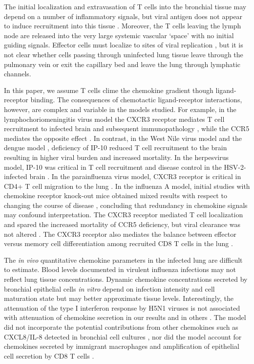 \documentclass[10pt]{article}
\begin{document}
The initial localization and extravasation of T cells into the bronchial tissue may depend on a number of inflammatory signals, but viral antigen does not appear to induce recruitment into this tissue \cite{Topham2001}.   Moreover, the T cells leaving the lymph node are released into the very large systemic vascular `space' with no initial guiding signals.  Effector cells must localize to sites of viral replication \cite{Cerwenka1999}, but it is not clear whether cells passing through uninfected lung tissue leave through the pulmonary vein or exit the capillary bed and leave the lung through lymphatic channels. 

In this paper, we assume T cells clime the chemokine gradient though ligand-receptor binding.  The consequences of chemotactic ligand-receptor interactions, however, are complex \cite{Groom2011a, Groom2011} and variable in the models studied.   For example, in the lymphochoriomeningitis virus model the CXCR3 receptor mediates T cell recruitment to infected brain and subsequent immunopathology \cite{Christensen2004, Christensen2006}, while the CCR5 mediates the opposite effect \cite{DeLemos2005}.  In contrast, in the West Nile virus model \cite{Klein2005} and the dengue model \cite{Hsieh2006}, deficiency of IP-10 reduced T cell recruitment to the brain resulting in higher viral burden and increased mortality.   In the herpesvirus model, IP-10 was critical in T cell recruitment and disease control in the HSV-2-infected brain \cite{Wuest2008, Thapa2008}.  In the parainfluenza virus model, CXCR3 receptor is critical in CD4+ T cell migration to the lung \cite{Kohlmeier2009}.  In the influenza A model, initial studies with chemokine receptor knock-out mice obtained mixed results with respect to changing the course of disease \cite{Dawson2000, Wareing2004}, concluding that redundancy in chemokine signals may confound interpretation.   The CXCR3 receptor mediated T cell localization and spared the increased mortality of CCR5 deficiency, but viral clearance was not altered \cite{Fadel2008}.  The CXCR3 receptor also mediates the balance between effector versus memory cell differentiation among recruited CD8 T cells in the lung \cite{Kohlmeier2011}.   

The \textit{in vivo} quantitative chemokine parameters in the infected lung are difficult to estimate.  Blood levels documented in virulent influenza infections \cite{DeJong2006} may not reflect lung tissue concentrations.  Dynamic chemokine concentrations secreted by bronchial epithelial cells \textit{in vitro} depend on infection intensity and cell maturation state \cite{Mitchell2011, Chan2010, Chan2005, Zeng2011} but may better approximate tissue levels.  Interestingly, the attenuation of the type I interferon response by H5N1 viruses is not associated with attenuation of chemokine secretion in our results and in others \cite{Zeng2007}.  The model did not incorporate the potential contributions from other chemokines such as CXCL8/IL-8 detected in bronchial cell cultures \cite{Matsukura1996, Arndt2002}, nor did the model account for chemokines secreted by immigrant macrophages \cite{Julkunen2000} and amplification of epithelial cell secretion by CD8 T cells \cite{Zhao2000}.
\end{document}

